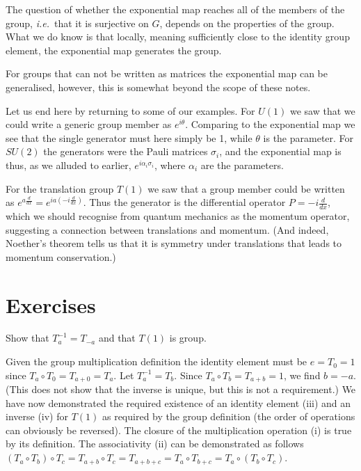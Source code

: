 \documentclass[notes.tex]{subfiles}
\begin{document}
The question of whether the exponential map reaches all of the members of the group, {\it i.e.}\ that it is surjective on $G$, depends on the properties of the group. What we do know is that locally, meaning sufficiently close to the identity group element, the exponential map generates the group.

For groups that can not be written as matrices the exponential map can be generalised, however, this is somewhat beyond the scope of these notes.

Let us end here by returning to some of our examples. For $U(1)$ we saw that we could write a generic group member as $e^{i\theta}$. Comparing to the exponential map we see that the single generator must here simply be 1, while $\theta$ is the parameter. For $SU(2)$ the generators were the Pauli matrices $\sigma_i$, and the exponential map is thus, as we alluded to earlier, $e^{i\alpha_i\sigma_i}$, where $\alpha_i$ are the parameters. 

For the translation group $T(1)$ we saw that a group member could be written as $e^{a\frac{d}{dx}}=e^{ia(-i\frac{d}{dx})}$. Thus the generator is the differential operator $P=-i\frac{d}{dx}$, which we should recognise from quantum mechanics as the momentum operator, suggesting a connection between translations and momentum. (And indeed, Noether's theorem tells us that it is symmetry under translations that leads to momentum conservation.)



\section{Exercises}
\begin{Exercise}[]
Show that $T_a^{-1} = T_{-a}$ and that $T(1)$ is group.
\end{Exercise}

\begin{Answer}
Given the group multiplication definition the identity element must be $e=T_0=1$ since $T_a\circ T_0=T_{a+0}=T_a$. Let $T_a^{-1} =T_b$. Since $T_a \circ T_b=T_{a+b}=1$, we find $b=-a$. (This does not show that the inverse is unique, but this is not a requirement.) We have now demonstrated the required existence of an identity element (iii) and an inverse (iv) for $T(1)$ as required by the group definition (the order of operations can obviously be reversed). The closure of the multiplication operation (i) is true by its definition. The associativity (ii) can be demonstrated as follows $(T_a\circ T_b)\circ T_c=T_{a+b}\circ T_c=T_{a+b+c}=T_{a}\circ T_{b+c}=T_a\circ (T_b\circ T_c)$.
\end{Answer}
\end{document}
